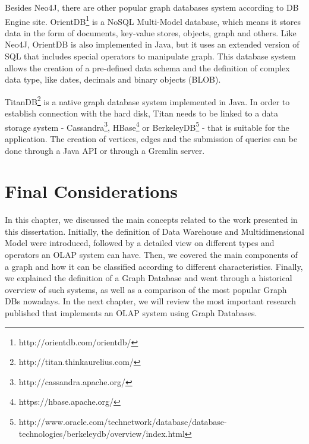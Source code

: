 Besides Neo4J, there are other popular graph databases system according to DB Engine site. OrientDB\footnote{http://orientdb.com/orientdb/} is a NoSQL Multi-Model database, which means it stores data in the form of documents, key-value stores, objects, graph and others. Like Neo4J, OrientDB is also implemented in Java, but it uses an extended version of SQL that includes special operators to manipulate graph. This database system allows the creation of a pre-defined data schema and the definition of complex data type, like dates, decimals and binary objects (BLOB).
 
TitanDB\footnote{http://titan.thinkaurelius.com/} is a native graph database system implemented in Java. In order to establish connection with the hard disk, Titan needs to be linked to a data storage system - Cassandra\footnote{http://cassandra.apache.org/}, HBase\footnote{https://hbase.apache.org/} or BerkeleyDB\footnote{http://www.oracle.com/technetwork/database/database-technologies/berkeleydb/overview/index.html} - that is suitable for the application. The creation of vertices, edges and the submission of queries can be done through a Java API or through a Gremlin server.

\section{Final Considerations}
In this chapter, we discussed the main concepts related to the work presented in this dissertation. Initially, the definition of Data Warehouse and Multidimensional Model were introduced, followed by a detailed view on different types and operators an OLAP system can have. Then, we covered the main components of a graph and how it can be classified according to different characteristics. Finally, we explained the definition of a Graph Database and went through a historical overview of such systems, as well as a comparison of the most popular Graph DBs nowadays. In the next chapter, we will review the most important research published that implements an OLAP system using Graph Databases.
